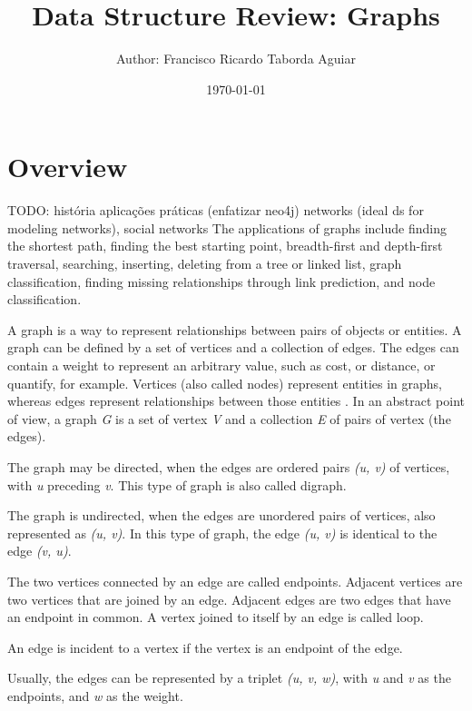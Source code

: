 \documentclass[a4paper]{article}
\title{
    Data Structure Review: Graphs\\
}
\author{
    \small{Author: Francisco Ricardo Taborda Aguiar}\\
}
\date{\today}
\begin{document}
    \maketitle


    \section{Overview}

    TODO:
    história
    aplicações práticas (enfatizar neo4j)
        networks (ideal ds for modeling networks), social networks
        The applications of graphs include finding the shortest path,
        finding the best starting point, breadth-first and depth-first
        traversal, searching, inserting, deleting from a tree or
        linked list, graph classification, finding missing relationships
        through link prediction, and node classification.

    A graph is a way to represent relationships between pairs
    of objects \cite{goodrich:2014} or entities.
    A graph can be defined by a set of vertices and a collection
    of edges. The edges can contain a weight to represent an
    arbitrary value, such as cost, or distance, or quantify,
    for example.
    Vertices (also called nodes) represent entities in graphs,
    whereas edges represent
    relationships between those entities \cite{xia:2021}.
    In an abstract point of view, a graph \emph{G} is a set of vertex
    \emph{V} and a collection \emph{E} of pairs of vertex (the edges).

    The graph may be directed, when the edges are ordered pairs
    \emph{(u, v)} of vertices, with \emph{u} preceding \emph{v}.
    This type of graph is also called digraph.

    The graph is undirected, when the edges are unordered pairs of
    vertices, also represented as \emph{(u, v)}. In this type of
    graph, the edge \emph{(u, v)} is identical to the edge
    \emph{(v, u)}.


    The two vertices connected by an edge are called endpoints.
    Adjacent vertices are two vertices that are joined by an edge.
    Adjacent edges are two edges that have an endpoint in common.
    A vertex joined to itself by an edge is called loop.

    An edge is incident to a vertex if the vertex is an endpoint of
    the edge.

    Usually, the edges can be represented by a triplet
    \emph{(u, v, w)}, with \emph{u} and \emph{v} as
    the endpoints, and \emph{w} as the weight.
\end{document}
